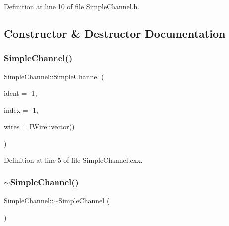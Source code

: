 Definition at line 10 of file Simple\+Channel.\+h.



\subsection{Constructor \& Destructor Documentation}
\mbox{\label{class_wire_cell_1_1_simple_channel_abee02dd46dcba8e9eb707ba0ecc50658}} 
\subsubsection{\texorpdfstring{Simple\+Channel()}{SimpleChannel()}}
{\footnotesize\ttfamily Simple\+Channel\+::\+Simple\+Channel (\begin{DoxyParamCaption}\item[{int}]{ident = {\ttfamily -\/1},  }\item[{int}]{index = {\ttfamily -\/1},  }\item[{const \hyperlink{class_wire_cell_1_1_i_data_ae1a9f863380499bb43f39fabb6276660}{I\+Wire\+::vector} \&}]{wires = {\ttfamily \hyperlink{class_wire_cell_1_1_i_data_ae1a9f863380499bb43f39fabb6276660}{I\+Wire\+::vector}()} }\end{DoxyParamCaption})}



Definition at line 5 of file Simple\+Channel.\+cxx.

\mbox{\label{class_wire_cell_1_1_simple_channel_ad3b599464d652e3128f7f43bace39082}} 
\subsubsection{\texorpdfstring{$\sim$\+Simple\+Channel()}{~SimpleChannel()}}
{\footnotesize\ttfamily Simple\+Channel\+::$\sim$\+Simple\+Channel (\begin{DoxyParamCaption}{ }\end{DoxyParamCaption})\hspace{0.3cm}{\ttfamily [virtual]}}



